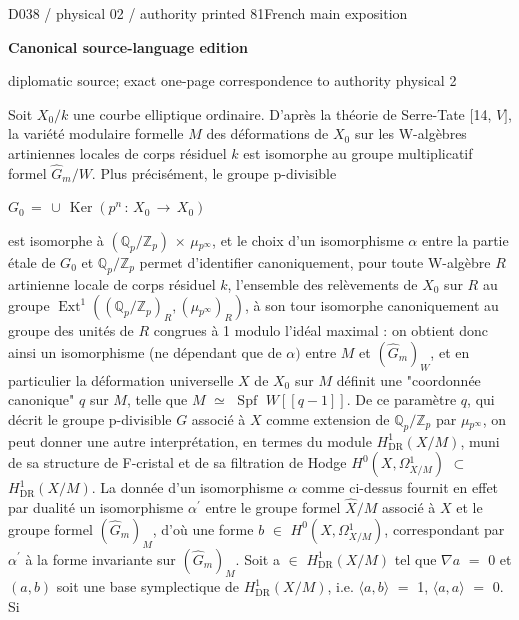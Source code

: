 \documentclass[9pt]{article}
\newcommand{\CanonHeading}[1]{\par\vspace{1.5pt}{\fontsize{8.6}{10.0}\selectfont\sffamily\bfseries\color{Accent} #1\par}\vspace{1.5pt}}
\newcommand{\CanonText}[1]{\par{\fontsize{8.0}{9.35}\selectfont\RaggedRight #1\par}\vspace{2.2pt}}
\newcommand{\CanonDisplay}[1]{\par\vspace{1.2pt}\begin{center}{\fontsize{7.2}{8.4}\selectfont\(\displaystyle #1\)}\end{center}\vspace{1.2pt}}
\newcommand{\LayerTitle}{Canonical source-language edition}
\begin{document}
\newpage
\noindent\begin{minipage}[t][\dimexpr\textheight-5pt\relax][t]{\textwidth}
{\sffamily\fontsize{7.3}{8.2}\selectfont\color{Quiet} D038 / physical 02 / authority printed 81\hfill French main exposition}
\par{}\vspace{4.5pt}
{\sffamily\fontsize{10.4}{11.6}\selectfont\bfseries\color{Accent} \LayerTitle}
\par{\sffamily\fontsize{6.7}{7.7}\selectfont\color{Quiet} diplomatic source; exact one-page correspondence to authority physical 2}
\vspace{5pt}
\CanonHeading{0. INTRODUCTION}
\CanonText{Soit \(X_{0}/k\) une courbe elliptique ordinaire. D'après la théorie de Serre-Tate [14, \(V]\), la variété modulaire formelle \(M\) des déformations de \(X_{0}\) sur les W-algèbres artiniennes locales de corps résiduel \(k\) est isomorphe au groupe multiplicatif formel \(\widehat{G}_{m}/W\). Plus précisément, le groupe p-divisible}
\CanonDisplay{G_{0}\,=\,\cup{}\,\operatorname{Ker}(p^{n}\,:\,X_{0}\,\to{}\,X_{0})}
\CanonText{est isomorphe à \((\mathbb{Q}_{p}/\mathbb{Z}_{p})\) \(\times{}\) \(\mu{}_{p^\infty{}}\), et le choix d'un isomorphisme \(\alpha{}\) entre la partie étale de \(G_{0}\) et \(\mathbb{Q}_{p}/\mathbb{Z}_{p}\) permet d'identifier canoniquement, pour toute W-algèbre \(R\) artinienne locale de corps résiduel \(k\), l'ensemble des relèvements de \(X_{0}\) sur \(R\) au groupe \(\operatorname{Ext}^{1}((\mathbb{Q}_{p}/\mathbb{Z}_{p})_{R},(\mu{}_{p^\infty{}})_{R})\), à son tour isomorphe canoniquement au groupe des unités de \(R\) congrues à 1 modulo l'idéal maximal : on obtient donc ainsi un isomorphisme (ne dépendant que de \(\alpha{})\) entre \(M\) et \((\widehat{G}_{m})_{W}\), et en particulier la déformation universelle \(X\) de \(X_{0}\) sur \(M\) définit une "coordonnée canonique" \(q\) sur \(M\), telle que \(M\) \(\simeq{}\) \(\operatorname{Spf}\) \(W[[q-1]]\). De ce paramètre \(q\), qui décrit le groupe p-divisible \(G\) associé à \(X\) comme extension de \(\mathbb{Q}_{p}/\mathbb{Z}_{p}\) par \(\mu{}_{p^\infty{}}\), on peut donner une autre interprétation, en termes du module \(H^{1}_{\mathrm{DR}}(X/M)\), muni de sa structure de F-cristal et de sa filtration de Hodge \(H^{0}(X,\Omega{}^{1}_{X/M})\) \(\subset{}\) \(H^{1}_{\mathrm{DR}}(X/M)\). La donnée d'un isomorphisme \(\alpha{}\) comme ci-dessus fournit en effet par dualité un isomorphisme \(\alpha{}^{\prime}\) entre le groupe formel \(\widehat{X}/M\) associé à \(X\) et le groupe formel \((\widehat{G}_{m})_{M}\), d'où une forme \(b\) \(\in{}\) \(H^{0}(X,\Omega{}^{1}_{X/M})\), correspondant par \(\alpha{}^{\prime}\) à la forme invariante sur \((\widehat{G}_{m})_{M}\). Soit a \(\in{}\) \(H^{1}_{\mathrm{DR}}(X/M)\) tel que \(\nabla{}a\) \(=\) 0 et \((a,b)\) soit une base symplectique de \(H^{1}_{\mathrm{DR}}(X/M)\), i.e. \(\langle{}a,b\rangle{}\) \(=\) 1, \(\langle{}a,a\rangle{}\) \(=\) 0. Si}

\end{minipage}
\end{document}
